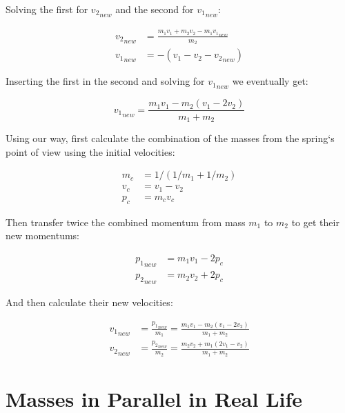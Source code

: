 \documentclass[]{../common/elementary-physics}
\begin{document}
Solving the first for ${v_2}_{new}$ and the second for ${v_1}_{new}$:

\begin{subequations}
\begin{align}
{v_2}_{new} &= \frac{m_1 v_1 + m_2 v_2 - m_1 {v_1}_{new}}{m_2} \\
{v_1}_{new} &= -(v_1 - v_2 - {v_2}_{new})
\end{align}
\end{subequations}

Inserting the first in the second and solving for ${v_1}_{new}$ we eventually get:

\begin{equation}
{v_1}_{new} = \frac{m_1 v_1 - m_2(v_1-2 v_2)}{m_1 + m_2}
\end{equation}

Using our way, first calculate the combination of the masses from the spring`s point of view using the initial velocities:

\begin{subequations}
\begin{align}
m_c &= 1/(1/m_1 + 1/m_2) \\
v_c &= v_1 - v_2 \\
p_c &= m_c v_c
\end{align}
\end{subequations}

Then transfer twice the combined momentum from mass $m_1$ to $m_2$ to get their new momentums:

\begin{subequations}
\begin{align}
{p_1}_{new} &= m_1 v_1 - 2 p_c \\
{p_2}_{new} &= m_2 v_2 + 2 p_c
\end{align}
\end{subequations}

And then calculate their new velocities:

\begin{subequations}
\begin{align}
{v_1}_{new} &= \frac{{p_1}_{new}}{m_1} = \frac{m_1 v_1 - m_2(v_1 - 2 v_2)}{m_1 + m_2} \\
{v_2}_{new} &= \frac{{p_2}_{new}}{m_2} = \frac{m_2 v_2 + m_1(2 v_1 - v_2)}{m_1 + m_2}
\end{align}
\end{subequations}

\section{Masses in Parallel in Real Life}
\end{document}
